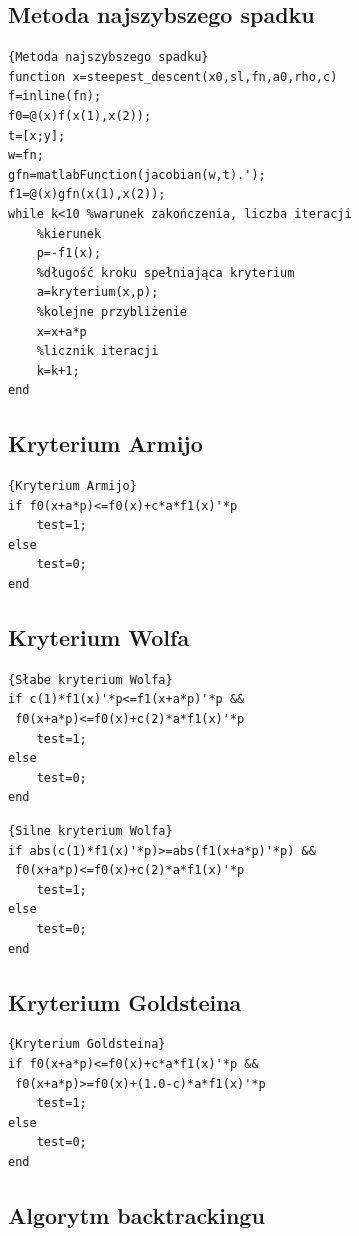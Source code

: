 \documentclass{classrep}
\begin{document}
\subsection{Metoda najszybszego spadku}

\begin{lstlisting}{Metoda najszybszego spadku}
function x=steepest_descent(x0,sl,fn,a0,rho,c)
f=inline(fn);
f0=@(x)f(x(1),x(2));
t=[x;y];
w=fn;
gfn=matlabFunction(jacobian(w,t).');
f1=@(x)gfn(x(1),x(2));
while k<10 %warunek zakończenia, liczba iteracji
    %kierunek
    p=-f1(x);
    %długość kroku spełniająca kryterium
    a=kryterium(x,p);
    %kolejne przybliżenie
    x=x+a*p
    %licznik iteracji
    k=k+1;
end
\end{lstlisting}

\subsection{Kryterium Armijo}

\begin{lstlisting}{Kryterium Armijo}
if f0(x+a*p)<=f0(x)+c*a*f1(x)'*p
    test=1;
else 
    test=0;
end
\end{lstlisting}


\subsection{Kryterium Wolfa}

\begin{lstlisting}{Słabe kryterium Wolfa}
if c(1)*f1(x)'*p<=f1(x+a*p)'*p &&
 f0(x+a*p)<=f0(x)+c(2)*a*f1(x)'*p
    test=1;
else 
    test=0;
end
\end{lstlisting}

\begin{lstlisting}{Silne kryterium Wolfa}
if abs(c(1)*f1(x)'*p)>=abs(f1(x+a*p)'*p) &&
 f0(x+a*p)<=f0(x)+c(2)*a*f1(x)'*p
    test=1;
else 
    test=0;
end
\end{lstlisting}


\subsection{Kryterium Goldsteina}

\begin{lstlisting}{Kryterium Goldsteina}
if f0(x+a*p)<=f0(x)+c*a*f1(x)'*p &&
 f0(x+a*p)>=f0(x)+(1.0-c)*a*f1(x)'*p
    test=1;
else 
    test=0;
end
\end{lstlisting}


\subsection{Algorytm backtrackingu}
\end{document}
